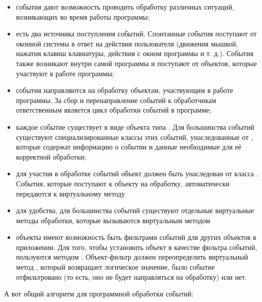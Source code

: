 \begin{itemize}
\item события дают возможность проводить обработку различных ситуаций, возникающих во время работы программы;
\item есть два источника поступления событий. Спонтанные события поступают от оконной системы в ответ на действия
пользователя (движения мышкой, нажатия клавиш клавиатуры, действия с окном программы и т. д.). События также возникают
внутри самой программы и поступают от объектов, которые участвуют в работе программы;
\item события направляются на обработку объектам, участвующим в работе программы. За сбор и перенаправление событий к
обработчикам ответственным является цикл обработки событий в программе;
\item каждое событие существует в виде объекта типа . Для большинства событий существуют
специализированные классы этих событий, унаследованные от , которые содержат информацию о событии
и данные необходимые для её корректной обработки;
\item для участия в обработке событий объект должен быть унаследован от класса . События, которые
поступают к объекту на обработку, автоматически передаются к виртуальному методу
\item для удобства, для большинства событий существуют отдельные виртуальные методы обработки, которые вызываются
виртуальным методом 
\item объекты имеют возможность быть фильтрами событий для других объектов в приложении. Для того, чтобы установить
объект в качестве фильтра событий, пользуются методом . Объект-фильтр должен
переопределить виртуальный метод , который возвращает логическое значение, было
событие отфильтровано (то есть, оно не будет направляться на обработку) или нет.
\end{itemize}
А вот общий алгоритм для программной обработки событий:

